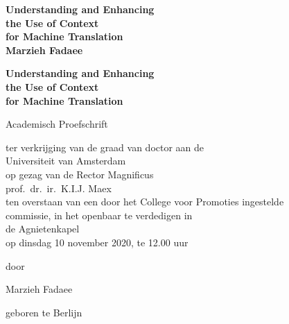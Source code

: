 
{\pagestyle{empty}
\newcommand{\printtitle}{%
{\Huge\bf Understanding and Enhancing \\ the Use of Context \\ for Machine Translation \\[0.8cm]
}}

\begin{titlepage}
\par\vskip 2cm
\begin{center}
\printtitle
\vfill
{\LARGE\bf Marzieh Fadaee}
\vskip 2cm
\end{center}
\end{titlepage}


\mbox{}\newpage
\setcounter{page}{1}


\clearpage
\par\vskip 2cm
\begin{center}
\printtitle
\par\vspace {4cm}
{\large \sc Academisch Proefschrift}
\par\vspace {1cm}
{\large ter verkrijging van de graad van doctor aan de \\
Universiteit van Amsterdam\\
op gezag van de Rector Magnificus\\
prof.\ dr.\ ir.\ K.I.J. Maex\\
ten overstaan van een door het College voor Promoties ingestelde \\
commissie, in het openbaar te verdedigen in \\
de Agnietenkapel\\
op dinsdag 10 november 2020, te 12.00 uur \\ }
\par\vspace {1cm} {\large door}
\par \vspace {1cm}
{\Large Marzieh Fadaee}
\par\vspace {1cm}
{\large geboren te Berlijn} %
\end{center}


}
